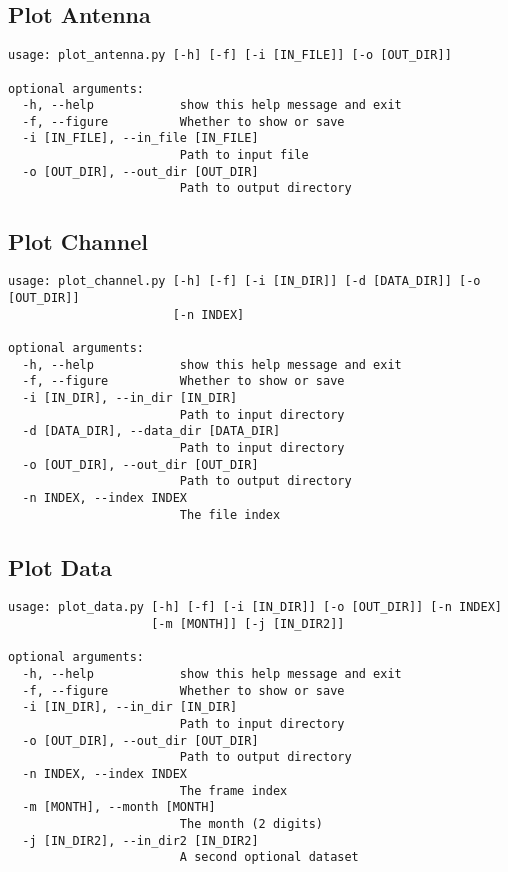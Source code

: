\subsection{Plot Antenna}
\label{sec:org9863205}
\begin{verbatim}
usage: plot_antenna.py [-h] [-f] [-i [IN_FILE]] [-o [OUT_DIR]]

optional arguments:
  -h, --help            show this help message and exit
  -f, --figure          Whether to show or save
  -i [IN_FILE], --in_file [IN_FILE]
                        Path to input file
  -o [OUT_DIR], --out_dir [OUT_DIR]
                        Path to output directory
\end{verbatim}

\subsection{Plot Channel}
\label{sec:org4fa2a4c}
\begin{verbatim}
usage: plot_channel.py [-h] [-f] [-i [IN_DIR]] [-d [DATA_DIR]] [-o [OUT_DIR]]
                       [-n INDEX]

optional arguments:
  -h, --help            show this help message and exit
  -f, --figure          Whether to show or save
  -i [IN_DIR], --in_dir [IN_DIR]
                        Path to input directory
  -d [DATA_DIR], --data_dir [DATA_DIR]
                        Path to input directory
  -o [OUT_DIR], --out_dir [OUT_DIR]
                        Path to output directory
  -n INDEX, --index INDEX
                        The file index
\end{verbatim}

\subsection{Plot Data}
\label{sec:org7b15066}
\begin{verbatim}
usage: plot_data.py [-h] [-f] [-i [IN_DIR]] [-o [OUT_DIR]] [-n INDEX]
                    [-m [MONTH]] [-j [IN_DIR2]]

optional arguments:
  -h, --help            show this help message and exit
  -f, --figure          Whether to show or save
  -i [IN_DIR], --in_dir [IN_DIR]
                        Path to input directory
  -o [OUT_DIR], --out_dir [OUT_DIR]
                        Path to output directory
  -n INDEX, --index INDEX
                        The frame index
  -m [MONTH], --month [MONTH]
                        The month (2 digits)
  -j [IN_DIR2], --in_dir2 [IN_DIR2]
                        A second optional dataset
\end{verbatim}

